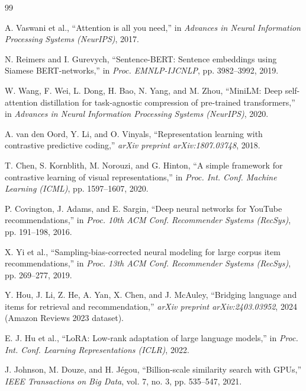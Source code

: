 \begin{thebibliography}{99}

A. Vaswani et al.,
``Attention is all you need,''
in \textit{Advances in Neural Information Processing Systems (NeurIPS)}, 2017.

N. Reimers and I. Gurevych,
``Sentence-BERT: Sentence embeddings using Siamese BERT-networks,''
in \textit{Proc. EMNLP-IJCNLP}, pp. 3982--3992, 2019.

W. Wang, F. Wei, L. Dong, H. Bao, N. Yang, and M. Zhou,
``MiniLM: Deep self-attention distillation for task-agnostic compression of
pre-trained transformers,''
in \textit{Advances in Neural Information Processing Systems (NeurIPS)}, 2020.

A. van den Oord, Y. Li, and O. Vinyals,
``Representation learning with contrastive predictive coding,''
\textit{arXiv preprint arXiv:1807.03748}, 2018.

T. Chen, S. Kornblith, M. Norouzi, and G. Hinton,
``A simple framework for contrastive learning of visual representations,''
in \textit{Proc. Int. Conf. Machine Learning (ICML)}, pp. 1597--1607, 2020.

P. Covington, J. Adams, and E. Sargin,
``Deep neural networks for YouTube recommendations,''
in \textit{Proc. 10th ACM Conf. Recommender Systems (RecSys)}, pp. 191--198, 2016.

X. Yi et al.,
``Sampling-bias-corrected neural modeling for large corpus item
recommendations,''
in \textit{Proc. 13th ACM Conf. Recommender Systems (RecSys)}, pp. 269--277, 2019.

Y. Hou, J. Li, Z. He, A. Yan, X. Chen, and J. McAuley,
``Bridging language and items for retrieval and recommendation,''
\textit{arXiv preprint arXiv:2403.03952}, 2024 (Amazon Reviews 2023 dataset).

E. J. Hu et al.,
``LoRA: Low-rank adaptation of large language models,''
in \textit{Proc. Int. Conf. Learning Representations (ICLR)}, 2022.

J. Johnson, M. Douze, and H. Jégou,
``Billion-scale similarity search with GPUs,''
\textit{IEEE Transactions on Big Data}, vol. 7, no. 3, pp. 535--547, 2021.


\end{thebibliography}
